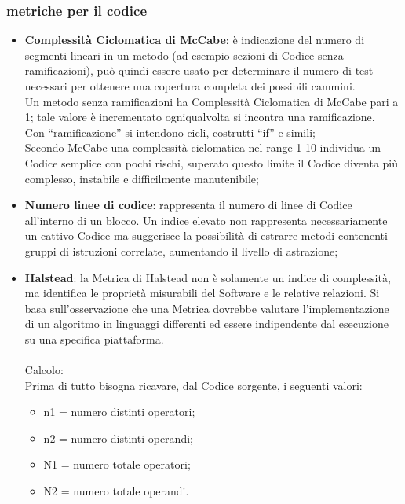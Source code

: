 {\subsubsection{metriche per il codice}{
	\begin{itemize}
		\item \textbf{Complessità Ciclomatica di McCabe}: è indicazione del numero di segmenti lineari in un metodo (ad esempio sezioni di Codice senza ramificazioni), può quindi essere usato per determinare il numero di test necessari per ottenere una copertura completa dei possibili cammini.  \\
		Un metodo senza ramificazioni ha Complessità Ciclomatica di McCabe pari a 1; tale valore è incrementato ogniqualvolta si incontra una ramificazione.  \\
		Con “ramificazione” si intendono cicli, costrutti “if” e simili;\\
		Secondo McCabe una complessità ciclomatica nel range 1-10 individua un Codice semplice con pochi rischi, superato questo limite il Codice diventa più complesso, instabile e difficilmente manutenibile;
		
		\item \textbf{Numero linee di codice}: rappresenta il numero di linee di Codice all'interno di un blocco. 
		Un indice elevato non rappresenta necessariamente un cattivo Codice ma suggerisce la possibilità di estrarre metodi contenenti gruppi di istruzioni correlate, aumentando il livello di astrazione;
		
		\item \textbf{Halstead}: la Metrica di Halstead non è solamente un indice di complessità, ma identifica le proprietà misurabili del Software e le relative relazioni. Si basa sull’osservazione che una Metrica dovrebbe	valutare l’implementazione di un algoritmo in linguaggi differenti ed essere indipendente dal esecuzione su una specifica piattaforma.\\\\
		Calcolo:\\
		Prima di tutto bisogna ricavare, dal Codice sorgente, i seguenti valori:
		\begin{itemize}		
		\item n1 = numero distinti operatori;
		\item n2 = numero distinti operandi;
		\item N1 = numero totale operatori;
		\item N2 = numero totale operandi.
		

\end{itemize}
\end{itemize}}}
